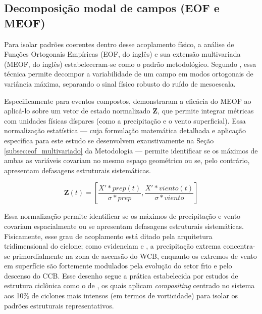 \subsection{Decomposição modal de campos (EOF e MEOF)}\label{subsec:tb_math_meof}

Para isolar padrões coerentes dentro desse acoplamento físico, a análise de Funções Ortogonais Empíricas (EOF, do inglês) e sua extensão multivariada (MEOF, do inglês) estabeleceram-se como o padrão metodológico. Segundo \citet{hannachi2007empirical}, essa técnica permite decompor a variabilidade de um campo em modos ortogonais de variância máxima, separando o sinal físico robusto do ruído de mesoescala. 

Especificamente para eventos compostos, \citet{liang2018multivariate} demonstraram a eficácia do MEOF ao aplicá-lo sobre um vetor de estado normalizado $\mathbf{Z}$, que permite integrar métricas com unidades físicas díspares (como a precipitação e o vento superficial). Essa normalização estatística — cuja formulação matemática detalhada e aplicação específica para este estudo se desenvolvem exaustivamente na Seção \ref{subsec:eof_multivariado} da Metodologia — permite identificar se os máximos de ambas as variáveis covariam no mesmo espaço geométrico ou se, pelo contrário, apresentam defasagens estruturais sistemáticas.

\begin{equation}
\mathbf{Z}(t) = \left[ \frac{X'*{prep}(t)}{\sigma*{prep}}, \frac{X'*{viento}(t)}{\sigma*{viento}} \right]
\end{equation}

Essa normalização permite identificar se os máximos de precipitação e vento covariam espacialmente ou se apresentam defasagens estruturais sistemáticas. Fisicamente, esse grau de acoplamento está ditado pela arquitetura tridimensional do ciclone; como evidenciam \citet{catto2015front} e \citet{schemm2014ccb}, a precipitação extrema concentra-se primordialmente na zona de ascensão do WCB, enquanto os extremos de vento em superfície são fortemente modulados pela evolução do setor frio e pelo descenso do CCB. 
Esse desenho segue a prática estabelecida por estudos de estrutura ciclônica como o de \citet{priestley2022improved}, os quais aplicam \textit{compositing} centrado no sistema aos 10\% de ciclones mais intensos (em termos de vorticidade) para isolar os padrões estruturais representativos.